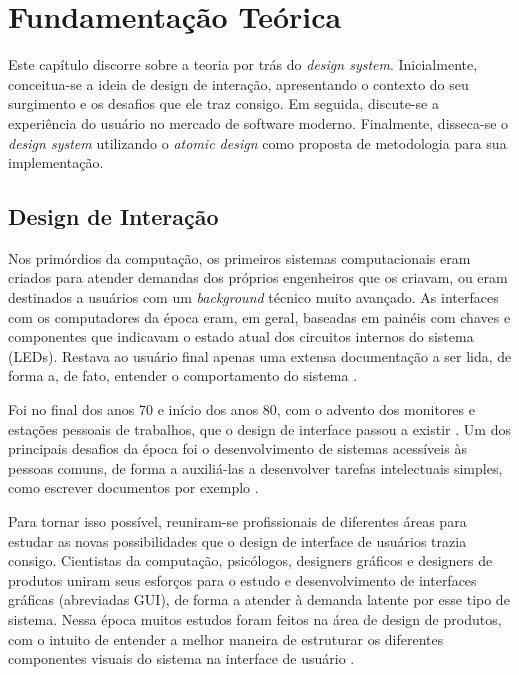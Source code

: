 
\chapter{Fundamentação Teórica}
\label{chap:fundamentacaoTeorica}

Este capítulo discorre sobre a teoria por trás do \textit{design system}. Inicialmente, conceitua-se a ideia de design de interação, apresentando o contexto do seu surgimento e os desafios que ele traz consigo. Em seguida, discute-se a experiência do usuário no mercado de software moderno. Finalmente, disseca-se o \textit{design system} utilizando o \textit{atomic design} como proposta de metodologia para sua implementação.

\section{Design de Interação}
\label{sec:designInteracao}

Nos primórdios da computação, os primeiros sistemas computacionais eram criados para atender demandas dos próprios engenheiros que os criavam, ou eram destinados a usuários com um \textit{background} técnico muito avançado. As interfaces com os computadores da época eram, em geral, baseadas em painéis com chaves e componentes que indicavam o estado atual dos circuitos internos do sistema (LEDs). Restava ao usuário final apenas uma extensa documentação a ser lida, de forma a, de fato, entender o comportamento do sistema \cite{preece2005design}.

Foi no final dos anos 70 e início dos anos 80, com o advento dos monitores e estações pessoais de trabalhos, que o design de interface passou a existir \cite{grudin1990computer}. Um dos principais desafios da época foi o desenvolvimento de sistemas acessíveis às pessoas comuns, de forma a auxiliá-las a desenvolver tarefas intelectuais simples, como escrever documentos por exemplo \cite{preece2005design}.

Para tornar isso possível, reuniram-se profissionais de diferentes áreas para estudar as novas possibilidades que o design de interface de usuários trazia consigo. Cientistas da computação, psicólogos, designers gráficos e designers de produtos uniram seus esforços para o estudo e desenvolvimento de interfaces gráficas (abreviadas GUI), de forma a atender à demanda latente por esse tipo de sistema. Nessa época muitos estudos foram feitos na área de design de produtos, com o intuito de entender a melhor maneira de estruturar os diferentes componentes visuais do sistema na interface de usuário \cite{preece2005design}.

